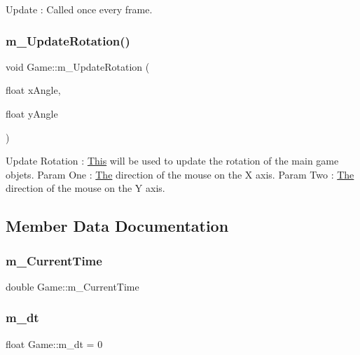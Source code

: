 Update \+: Called once every frame. \mbox{\label{class_game_a273123d60e201675b10125e5fd6924c0}} 
\subsubsection{\texorpdfstring{m\+\_\+\+Update\+Rotation()}{m\_UpdateRotation()}}
{\footnotesize\ttfamily void Game\+::m\+\_\+\+Update\+Rotation (\begin{DoxyParamCaption}\item[{float}]{x\+Angle,  }\item[{float}]{y\+Angle }\end{DoxyParamCaption})}

Update Rotation \+: \mbox{\hyperlink{class_this}{This}} will be used to update the rotation of the main game objets. Param One \+: \mbox{\hyperlink{class_the}{The}} direction of the mouse on the X axis. Param Two \+: \mbox{\hyperlink{class_the}{The}} direction of the mouse on the Y axis. 

\subsection{Member Data Documentation}
\mbox{\label{class_game_a64c09b759d06281923ae87570620795b}} 
\subsubsection{\texorpdfstring{m\+\_\+\+Current\+Time}{m\_CurrentTime}}
{\footnotesize\ttfamily double Game\+::m\+\_\+\+Current\+Time}

\mbox{\label{class_game_a8c30d8841546c309f40a8e128d1e9207}} 
\subsubsection{\texorpdfstring{m\+\_\+dt}{m\_dt}}
{\footnotesize\ttfamily float Game\+::m\+\_\+dt = 0}

\mbox{\label{class_game_ad01d32edc479a3edc79e5a3d7b4281d2}} 
